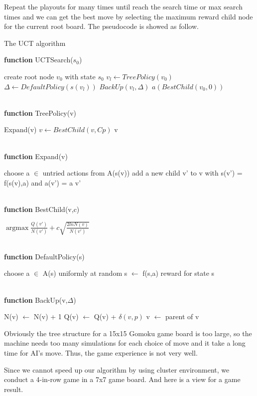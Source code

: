 \documentclass[12pt,a4paper]{article}
\begin{document}
\par Repeat the playouts for many times until reach the search time or max search times and we can get the best move by selecting the maximum reward child node for the current root board. The pseudocode is showed as follow.
\begin{algorithm}[H]
\caption{The UCT algorithm}
\hspace*{0.02in} {\bf function}
UCTSearch($s_0$)
\begin{algorithmic}
\State create root node $v_0$ with state $s_0$
	\State $v_l \gets TreePolicy(v_0)$
	\State $\Delta \gets DefaultPolicy(s(v_l))$
	\State $BackUp(v_l, \Delta)$
\EndWhile
\State \Return $a(BestChild(v_0, 0))$
\end{algorithmic}
~\\
\hspace*{0.02in} {\bf function}
TreePolicy(v)
\begin{algorithmic}
		\State \Return Expand(v)
	\Else
		\State $v \gets BestChild(v, Cp)$
	\EndIf
\EndWhile
\State \Return v
\end{algorithmic}
~\\
\hspace*{0.02in} {\bf function}
Expand(v)
\begin{algorithmic}
\State choose a $\in$ untried actions from A(s(v))
\State add a new child v' to v with s(v') = f(s(v),a) and a(v') = a
\State \Return v'
\end{algorithmic}
~\\
\hspace*{0.02in} {\bf function}
BestChild(v,c)
\begin{algorithmic}
\State \Return $\mathop{\arg\max} \frac{Q(v')}{N(v')} + c\sqrt{\frac{2lnN(v)}{N(v')}}$
\end{algorithmic}
~\\
\hspace*{0.02in} {\bf function}
DefaultPolicy(s)
\begin{algorithmic}
	\State choose a $\in$ A(s) uniformly at random
	\State s $\gets$ f(s,a)
\EndWhile
\State \Return reward for state s
\end{algorithmic}
~\\
\hspace*{0.02in} {\bf function}
BackUp(v,$\Delta$)
\begin{algorithmic}
	\State N(v) $\gets$ N(v) + 1
	\State Q(v) $\gets$ Q(v) + $\delta(v, p)$
	\State v $\gets$ parent of v
\EndWhile
\end{algorithmic}
\end{algorithm}
\par Obviously the tree structure for a 15x15 Gomoku game board is too large, so the machine needs too many simulations for each choice of move and it take a long time for AI's move. Thus, the game experience is not very well.
\par Since we cannot speed up our algorithm by using cluster environment, we conduct a 4-in-row game in a 7x7 game board. And here is a view for a game result.
\end{document}

